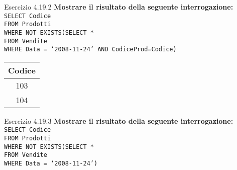 \begin{frame}{Esercizio 4.19.2}
    \textbf{Mostrare il risultato della seguente interrogazione:}\\
    \texttt{SELECT Codice\\FROM Prodotti\\WHERE NOT EXISTS(SELECT *\\\hspace{8,5em}FROM Vendite\\\hspace{8,5em}WHERE Data = `2008-11-24' AND CodiceProd=Codice)}
    \begin{table}[h]
    \centering
    \begin{minipage}{.45\textwidth}
    \centering
    \begin{tabular}{|c|}
    \hline
    \rowcolor{cyan!30} Codice \\
    \hline
    103\\
    \hline
    104\\
    \hline
    \end{tabular}
    \end{minipage}%
    \end{table}
\end{frame}
\begin{frame}{Esercizio 4.19.3}
    \textbf{Mostrare il risultato della seguente interrogazione:}\\
    \texttt{SELECT Codice\\FROM Prodotti\\WHERE NOT EXISTS(SELECT *\\\hspace{8,5em}FROM Vendite\\\hspace{8,5em}WHERE Data = `2008-11-24')}
\end{frame}

